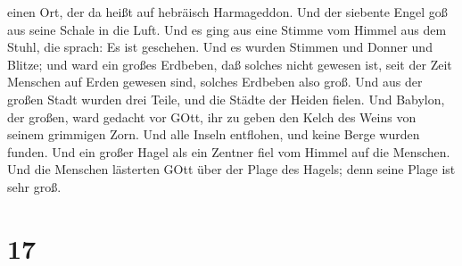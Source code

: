 einen Ort, der da heißt auf hebräisch Harmageddon.  Und der
siebente Engel goß aus seine Schale in die Luft. Und es ging aus eine
Stimme vom Himmel aus dem Stuhl, die sprach: Es ist geschehen.
 Und es wurden Stimmen und Donner und Blitze; und ward ein
großes Erdbeben, daß solches nicht gewesen ist, seit der Zeit Menschen
auf Erden gewesen sind, solches Erdbeben also groß.  Und
aus der großen Stadt wurden drei Teile, und die Städte der Heiden
fielen. Und Babylon, der großen, ward gedacht vor GOtt, ihr zu geben den
Kelch des Weins von seinem grimmigen Zorn.  Und alle Inseln
entflohen, und keine Berge wurden funden.  Und ein großer
Hagel als ein Zentner fiel vom Himmel auf die Menschen. Und die Menschen
lästerten GOtt über der Plage des Hagels; denn seine Plage ist sehr
groß.

\hypertarget{section-15}{%
\section{17}\label{section-15}}

